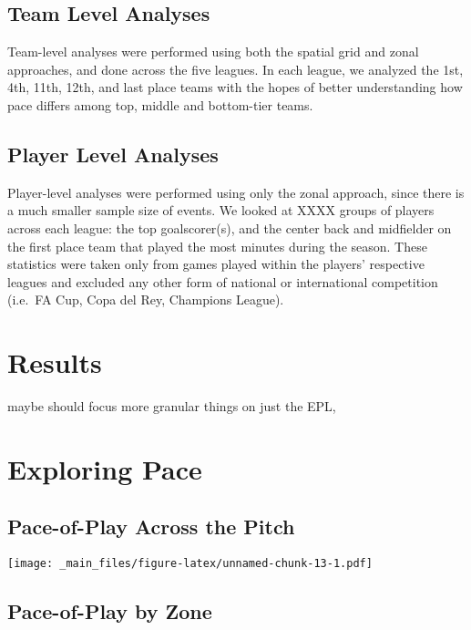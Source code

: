 \documentclass[]{book}
\begin{document}
\hypertarget{team-level-analyses}{%
\section{Team Level Analyses}\label{team-level-analyses}}

Team-level analyses were performed using both the spatial grid and zonal approaches, and done across the five leagues. In each league, we analyzed the 1st, 4th, 11th, 12th, and last place teams with the hopes of better understanding how pace differs among top, middle and bottom-tier teams.

\hypertarget{player-level-analyses}{%
\section{Player Level Analyses}\label{player-level-analyses}}

Player-level analyses were performed using only the zonal approach, since there is a much smaller sample size of events. We looked at XXXX groups of players across each league: the top goalscorer(s), and the center back and midfielder on the first place team that played the most minutes during the season. These statistics were taken only from games played within the players' respective leagues and excluded any other form of national or international competition (i.e.~FA Cup, Copa del Rey, Champions League).

\hypertarget{results}{%
\chapter{Results}\label{results}}

maybe should focus more granular things on just the EPL,

\hypertarget{exploring-pace}{%
\chapter{Exploring Pace}\label{exploring-pace}}

\hypertarget{pace-of-play-across-the-pitch}{%
\section{Pace-of-Play Across the Pitch}\label{pace-of-play-across-the-pitch}}

\texttt{[image: \_main\_files/figure-latex/unnamed-chunk-13-1.pdf]}

\hypertarget{pace-of-play-by-zone}{%
\section{Pace-of-Play by Zone}\label{pace-of-play-by-zone}}
\end{document}
